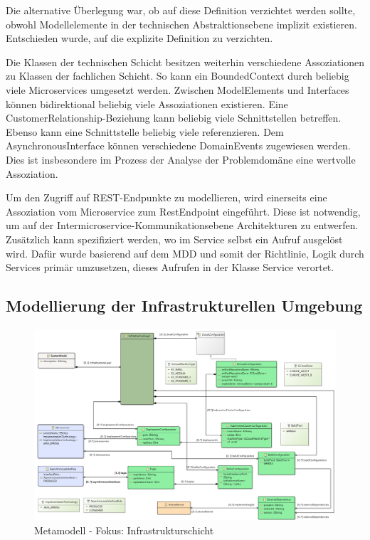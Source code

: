 Die alternative Überlegung war, ob auf diese Definition verzichtet werden sollte, obwohl Modellelemente in der technischen Abstraktionsebene implizit existieren. Entschieden wurde, auf die explizite Definition zu verzichten.

Die Klassen der technischen Schicht besitzen weiterhin verschiedene Assoziationen zu Klassen der fachlichen Schicht. So kann ein BoundedContext durch beliebig viele Microservices umgesetzt werden. Zwischen ModelElements und Interfaces können bidirektional beliebig viele Assoziationen existieren. Eine CustomerRelationship-Beziehung kann beliebig viele Schnittstellen betreffen. Ebenso kann eine Schnittstelle beliebig viele referenzieren. Dem AsynchronousInterface können verschiedene DomainEvents zugewiesen werden. Dies ist insbesondere im Prozess der Analyse der Problemdomäne eine wertvolle Assoziation.

Um den Zugriff auf REST-Endpunkte zu modellieren, wird einerseits eine Assoziation vom Microservice zum RestEndpoint eingeführt. Diese ist notwendig, um auf der Intermicroservice-Kommunikationsebene Architekturen zu entwerfen. Zusätzlich kann spezifiziert werden, wo im Service selbst ein Aufruf ausgelöst wird. Dafür wurde basierend auf dem MDD und somit der Richtlinie, Logik durch Services primär umzusetzen, dieses Aufrufen in der Klasse Service verortet.

\subsection{Modellierung der Infrastrukturellen Umgebung}

\begin{figure}[ht]
\centering
\includegraphics[width=\textwidth]{bilder/k4/6.png}
\caption{Metamodell - Fokus: Infrastrukturschicht}
\end{figure}

